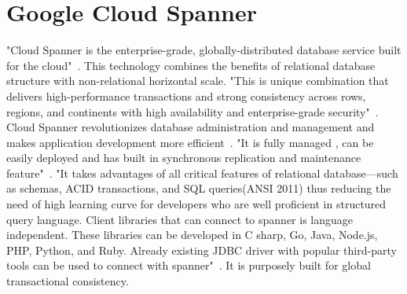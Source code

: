 \section{Google Cloud Spanner}

"Cloud Spanner is the enterprise-grade, globally-distributed database 
service built for the cloud"~\cite{hid-sp18-523-www-google-spanner}. 
This technology combines the benefits of relational database structure 
with non-relational horizontal scale. "This is unique combination that 
delivers high-performance transactions and strong consistency across rows, 
regions, and continents with high availability and enterprise-grade 
security"~\cite{hid-sp18-523-www-google-spanner}. Cloud Spanner 
revolutionizes database administration and management and makes 
application development more efficient~\cite{hid-sp18-523-www-google-spanner}.
"It is fully managed , can be easily deployed and has built in synchronous 
replication and maintenance feature"~\cite{hid-sp18-523-www-google-spanner}. 
"It takes advantages of all critical features of relational database—such 
as schemas, ACID transactions, and SQL queries(ANSI 2011) thus reducing 
the need of high learning curve for developers who are well proficient in 
structured query language. 
Client libraries that can connect to spanner is language independent. 
These libraries can be developed in C sharp, Go, Java, Node.js, PHP, Python, 
and Ruby. Already existing JDBC driver with popular third-party tools can be 
used to connect with spanner"~\cite{hid-sp18-523-www-google-spanner}. It is 
purposely built for global transactional consistency.
